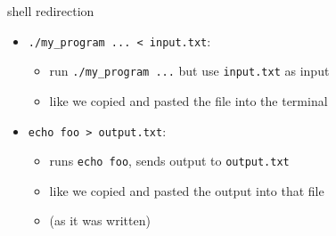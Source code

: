 \usetikzlibrary{matrix,patterns,arrows.meta,decorations.pathreplacing,shapes.misc,fit}

\begin{frame}[fragile,label=redirectExample]{shell redirection}
\begin{itemize}
\item \verb|./my_program ... < input.txt|: 
    \begin{itemize}
    \item run \verb|./my_program ...| but use \verb|input.txt| as input
    \item like we copied and pasted the file into the terminal
    \end{itemize}
\vspace{.5cm}
\item \verb|echo foo > output.txt|:
    \begin{itemize}
    \item runs \verb|echo foo|, sends output to \verb|output.txt|
    \item like we copied and pasted the output into that file 
    \item (as it was written)
    \end{itemize}
\end{itemize}
\end{frame}

